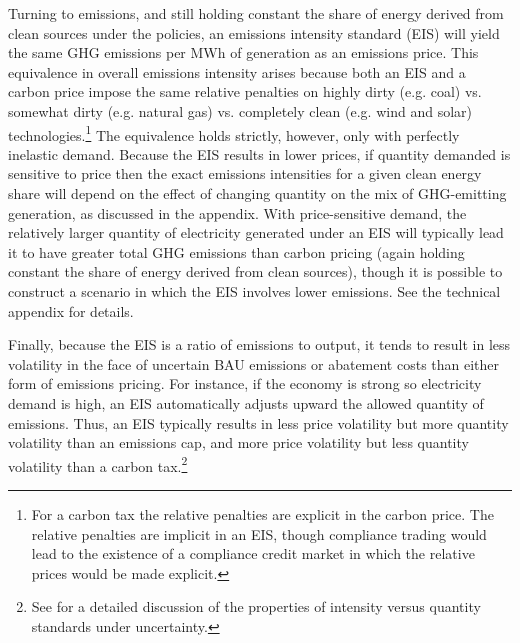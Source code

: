 \documentclass[12pt]{article}
\begin{document}
Turning to emissions, and still holding constant the share of energy derived from clean sources under the policies, an emissions intensity standard (EIS) will yield the same GHG emissions per MWh of generation as an emissions price. This equivalence in overall emissions intensity arises because both an EIS and a carbon price impose the same relative penalties on highly dirty (e.g. coal) vs. somewhat dirty (e.g. natural gas) vs. completely clean (e.g. wind and solar) technologies.\footnote{For a carbon tax the relative penalties are explicit in the carbon price. The relative penalties are implicit in an EIS, though compliance trading would lead to the existence of a compliance credit market in which the relative prices would be made explicit.} The equivalence holds strictly, however, only with perfectly inelastic demand. Because the EIS results in lower prices, if quantity demanded is sensitive to price then the exact emissions intensities for a given clean energy share will depend on the effect of changing quantity on the mix of GHG-emitting generation, as discussed in the appendix. With price-sensitive demand, the relatively larger quantity of electricity generated under an EIS will typically lead it to have greater total GHG emissions than carbon pricing (again holding constant the share of energy derived from clean sources), though it is possible to construct a scenario in which the EIS involves lower emissions. See the technical appendix for details.

Finally, because the EIS is a ratio of emissions to output, it tends to result in less volatility in the face of uncertain BAU emissions or abatement costs than either form of emissions pricing. For instance, if the economy is strong so electricity demand is high, an EIS automatically adjusts upward the allowed quantity of emissions. Thus, an EIS typically results in less price volatility but more quantity volatility than an emissions cap, and more price volatility but less quantity volatility than a carbon tax.\footnote{See \cite{kellogg2020output} for a detailed discussion of the properties of intensity versus quantity standards under uncertainty.}
\end{document}
